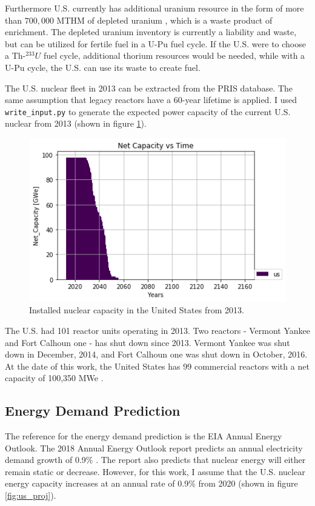 Furthermore U.S. currently has additional uranium resource in the
form of more than $700,000$ MTHM of depleted uranium \cite{office_nuclear_2011},
which is a waste product of enrichment. The depleted uranium inventory
is currently a liability and waste, but can be utilized for fertile fuel
in a U-Pu fuel cycle. If the U.S. were to choose a Th-$^233U$ fuel cycle,
additional thorium resources would be needed, while with a U-Pu cycle, the
U.S. can use its waste to create fuel.

The U.S. nuclear fleet in 2013 can be extracted from the \gls{PRIS} database.
The same assumption that legacy reactors have a 60-year lifetime is applied.
I used \texttt{write\_input.py} to generate the expected power capacity
of the current U.S. nuclear from 2013 (shown in figure \ref{fig:us_legacy}).

\begin{figure}[htbp!]
	\begin{center}
		\includegraphics[scale=0.6]{./images/us/legacy_power.png}
	\end{center}
	\caption{Installed nuclear capacity in the United States from 2013.}
	\label{fig:us_legacy}
\end{figure}

The U.S. had 101 reactor units operating in 2013. Two reactors -
Vermont Yankee and Fort Calhoun one - has shut down since 2013.
Vermont Yankee was shut down in December, 2014, and Fort
Calhoun one was shut down in October, 2016. At the date of this
work, the United States has 99 commercial reactors with a 
net capacity of 100,350 \gls{MWe} \cite{iaea_nuclear_2017}.



\subsection{Energy Demand Prediction}
The reference for the energy demand prediction is the 
\gls{EIA} Annual Energy Outlook.
The 2018 Annual Energy Outlook report predicts an annual electricity demand growth
of 0.9\% \cite{u.s._annual_2018}. The report also predicts that nuclear
energy will either remain static or decrease. However, for this work,
I assume that the U.S. nuclear energy capacity increases at an annual
rate of 0.9\% from 2020 (shown in figure \ref{fig:us_proj}).

